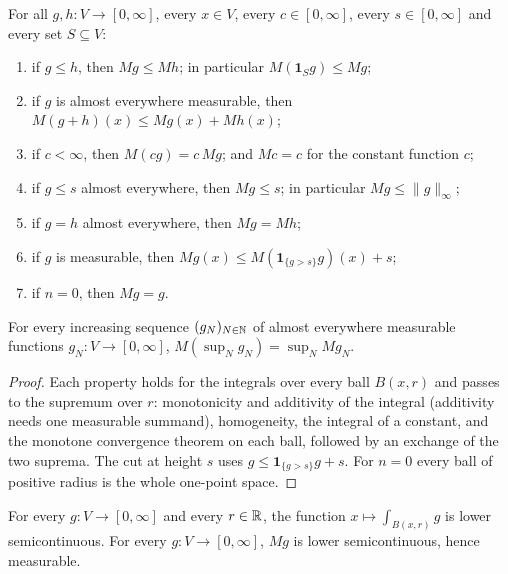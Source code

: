 \begin{lemma}
\label{lem:maximal-function-basic}
\leanok
{}
For all $g, h : V \to [0, \infty]$, every $x \in V$, every $c \in [0, \infty]$, every
$s \in [0, \infty]$ and every set $S \subseteq V$:
\begin{enumerate}
  \item if $g \leq h$, then $M g \leq M h$; in particular $M(\mathbf 1_S g) \leq M g$;
  \item if $g$ is almost everywhere measurable, then $M(g + h)(x) \leq M g(x) + M h(x)$;
  \item if $c < \infty$, then $M(c g) = c \, M g$; and $M c = c$ for the constant function $c$;
  \item if $g \leq s$ almost everywhere, then $M g \leq s$; in particular $M g \leq \|g\|_\infty$;
  \item if $g = h$ almost everywhere, then $M g = M h$;
  \item if $g$ is measurable, then $M g(x) \leq M(\mathbf 1_{\{g > s\}} g)(x) + s$;
  \item if $n = 0$, then $M g = g$.
\end{enumerate}
For every increasing sequence $(g_N)_{N \in \mathbb{N}}$ of almost everywhere measurable functions
$g_N : V \to [0, \infty]$, $M(\sup_N g_N) = \sup_N M g_N$.
\end{lemma}

\begin{proof}
\leanok
Each property holds for the integrals over every ball $B(x, r)$ and passes to the supremum over
$r$: monotonicity and additivity of the integral (additivity needs one measurable summand),
homogeneity, the integral of a constant, and the monotone convergence theorem on each ball,
followed by an exchange of the two suprema. The cut at height $s$ uses
$g \leq \mathbf 1_{\{g > s\}} g + s$. For $n = 0$ every ball of positive radius is the whole
one-point space.
\end{proof}

\begin{lemma}
\label{lem:maximal-function-measurable}
\leanok
{}
For every $g : V \to [0, \infty]$ and every $r \in \mathbb{R}$, the function
$x \mapsto \int_{B(x,r)} g$ is lower semicontinuous. For every $g : V \to [0, \infty]$, $M g$ is
lower semicontinuous, hence measurable.
\end{lemma}

